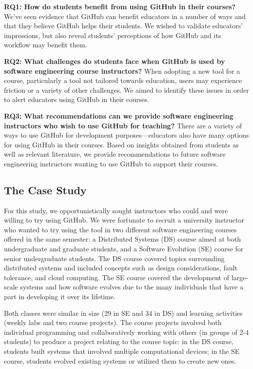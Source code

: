 \textbf{RQ1: How do students benefit from using GitHub in their courses?} We've seen evidence that GitHub can benefit educators in a number of ways \cite{zagalsky2015emergence} and that they believe GitHub helps their students. We wished to validate educators' impressions, but also reveal students' perceptions of how GitHub and its workflow may benefit them.

\textbf{RQ2: What challenges do students face when GitHub is used by software engineering course instructors?} When adopting a new tool for a course, particularly a tool not tailored towards education, users may experience friction or a variety of other challenges. We aimed to identify these issues in order to alert educators using GitHub in their courses.

\textbf{RQ3: What recommendations can we provide software engineering instructors who wish to use GitHub for teaching?} There are a variety of ways to use GitHub for development purposes---educators also have many options for using GitHub in their courses. Based on insights obtained from students as well as relevant literature, we provide recommendations to future software engineering instructors wanting to use GitHub to support their courses.

\subsection{The Case Study}
For this study, we opportunistically sought instructors who could and were willing to try using GitHub. We were fortunate to recruit a university instructor who wanted to try using the tool in two different software engineering courses offered in the same semester: a Distributed Systems (DS) course aimed at both undergraduate and graduate students, and a Software Evolution (SE) course for senior undergraduate students. The DS course covered topics surrounding distributed systems and included concepts such as design considerations, fault tolerance, and cloud computing. The SE course covered the development of large-scale systems and how software evolves due to the many individuals that have a part in developing it over its lifetime.

Both classes were similar in size (29 in SE and 34 in DS) and learning activities (weekly labs and two course projects). The course projects involved both individual programming and collaboratively working with others (in groups of 2-4 students) to produce a project relating to the course topic: in the DS course, students built systems that involved multiple computational devices; in the SE course, students evolved existing systems or utilized them to create new ones.

